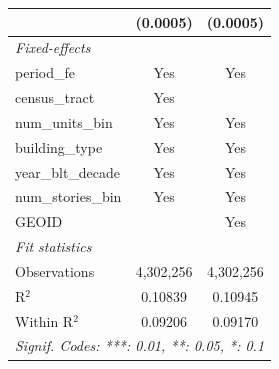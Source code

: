 \begin{tabular}{lcc}
                                                                       & (0.0005)               & (0.0005)\\   
   \midrule
   \emph{Fixed-effects}\\
   period\_fe                                                          & Yes                    & Yes\\  
   census\_tract                                                       & Yes                    & \\  
   num\_units\_bin                                                     & Yes                    & Yes\\  
   building\_type                                                      & Yes                    & Yes\\  
   year\_blt\_decade                                                   & Yes                    & Yes\\  
   num\_stories\_bin                                                   & Yes                    & Yes\\  
   GEOID                                                               &                        & Yes\\  
   \midrule
   \emph{Fit statistics}\\
   Observations                                                        & 4,302,256              & 4,302,256\\  
   R$^2$                                                               & 0.10839                & 0.10945\\  
   Within R$^2$                                                        & 0.09206                & 0.09170\\  
   \midrule \midrule
   \multicolumn{3}{l}{\emph{Signif. Codes: ***: 0.01, **: 0.05, *: 0.1}}\\
\end{tabular}
\par\endgroup
\begingroup
\centering

